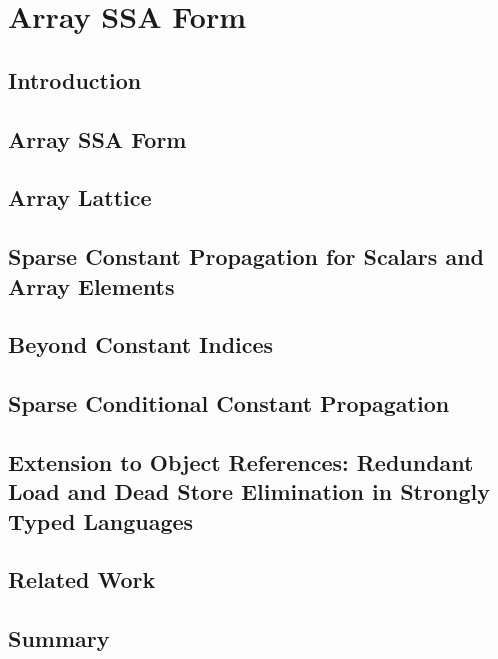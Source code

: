 \chapter{Array SSA Form }

\section{Introduction}
\label{sec:intro}


\section{Array SSA Form}
\label{sec:arrayssa}


\section{Array Lattice}
\label{sec:arraylattice}


\section{Sparse Constant Propagation for Scalars and Array Elements}
\label{sec:sc}


\section{Beyond Constant Indices}
\label{sec:non-const}



\section{Sparse Conditional Constant Propagation}
\label{sec:scc}


\section{Extension to Object References: Redundant Load and Dead Store Elimination in Strongly Typed Languages}
\label{sec:heap}


\section{Related Work}
\label{sec:related}


\section{Summary}
\label{sec:conclusions}


